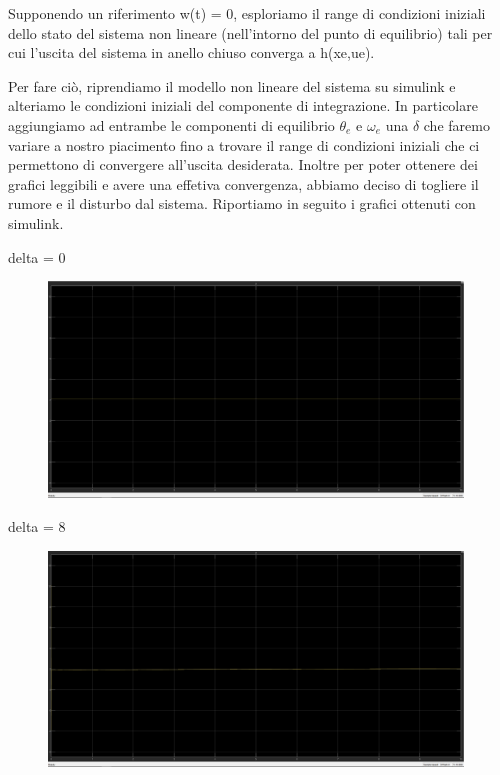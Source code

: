 \documentclass[a4paper, 11pt]{article}
\begin{document}
Supponendo un riferimento w(t) = 0, esploriamo il range di condizioni iniziali dello stato del sistema non lineare (nell’intorno del punto di equilibrio) tali per cui l’uscita del sistema in anello chiuso converga a h(xe,ue).

Per fare ciò, riprendiamo il modello non lineare del sistema su simulink e alteriamo le condizioni iniziali del componente di integrazione. In particolare aggiungiamo ad entrambe le componenti di equilibrio $\theta_e$ e $\omega_e$ una $\delta$ che faremo variare a nostro piacimento fino a trovare il range di condizioni iniziali che ci permettono di convergere all'uscita desiderata.
Inoltre per poter ottenere dei grafici leggibili e avere una effetiva convergenza, abbiamo deciso di togliere il rumore e il disturbo dal sistema.
Riportiamo in seguito i grafici ottenuti con simulink.

delta = 0\\
\begin{figure}[H]
    \centering
\includegraphics[width=110mm]{figs/delta0.PNG}
    \caption{}
    \label{Figura11}
\end{figure}

delta = 8\\
\begin{figure}[H]
    \centering
\includegraphics[width=110mm]{figs/delta8.PNG}
    \caption{}
    \label{Figura12}
\end{figure}
\end{document}
